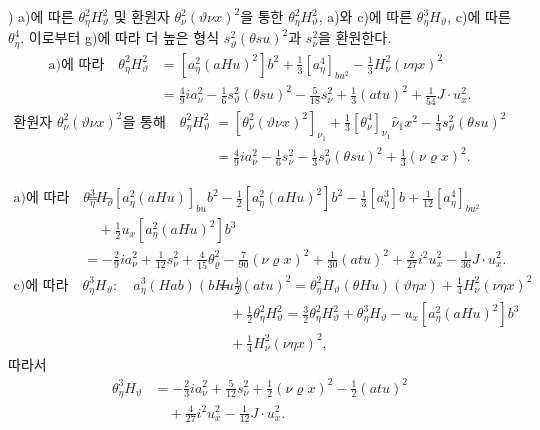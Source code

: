 ) a)에 따른 $\theta_\eta^2H_\vartheta^2$ 및 환원자 $\theta_\nu^2(\vartheta\nu x)^2$을 통한 $\theta_\eta^2H_\vartheta^2$, a)와 c)에 따른 $\theta_\eta^3H_\vartheta$, c)에 따른 $\theta_\eta^4$. 이로부터 g)에 따라 더 높은 형식 $s_\vartheta^2(\theta su)^2$과 $s_\nu^2$을 환원한다.
\[
\begin{aligned}
\text{a)에 따라}\quad
\theta_\eta^2H_\vartheta^2&=[a_\eta^2(aHu)^2]b^2+\frac13[a_\eta^4]_{bu^2}-\frac13H_\nu^2(\nu\eta x)^2\\
&=\frac49ia_\nu^2-\frac16s_\vartheta^2(\theta su)^2-\frac5{18}s_\nu^2+\frac13(atu)^2+\frac1{54}J\cdot u_x^2.
\end{aligned}
\]
\[
\begin{aligned}
\text{환원자 }\theta_\nu^2(\vartheta\nu x)^2\text{을 통해}\quad
\theta_\eta^2H_\vartheta^2
&=[\theta_\nu^2(\vartheta\nu x)^2]_{\nu_1}+\frac13[\theta_\nu^4]_{\nu_1}\widehat{\nu}_1x^2-\frac13s_\vartheta^2(\theta su)^2\\
&=\frac49ia_\nu^2-\frac16s_\nu^2-\frac13s_\vartheta^2(\theta su)^2+\frac13(\nu\varrho x)^2.
\end{aligned}
\]

\[
\begin{aligned}
\text{a)에 따라}\quad
\theta_\eta^3H_\vartheta&=-[a_\eta^2(aHu)]_{bu}b^2-\frac12[a_\eta^2(aHu)^2]b^2-\frac13[a_\eta^3]b+\frac1{12}[a_\eta^4]_{bu^2}\\
&\quad+\frac12u_x[a_\eta^2(aHu)^2]b^3\\
&=-\frac29ia_\nu^2+\frac1{12}s_\nu^2+\frac4{15}\theta_\varrho^2-\frac7{90}(\nu\varrho x)^2+\frac1{30}(atu)^2+\frac2{27}i^2u_x^2-\frac1{36}J\cdot u_x^2.
\end{aligned}
\]
\[
\begin{aligned}
\text{c)에 따라}\quad
\theta_\eta^3H_\vartheta:\quad a_\eta^3(Hab)(bHu)&=\frac12(atu)^2
=\theta_\eta^2H_\vartheta(\theta Hu)(\vartheta\eta x)+\frac14H_\nu^2(\nu\eta x)^2\\
&\quad+\frac12\theta_\eta^2H_\vartheta^2
=\frac32\theta_\eta^2H_\vartheta^2+\theta_\eta^3H_\vartheta-u_x[a_\eta^2(aHu)^2]b^3\\
&\quad+\frac14H_\nu^2(\nu\eta x)^2,
\end{aligned}
\]
따라서
\[
\begin{aligned}
\theta_\eta^3H_\vartheta&=-\frac23ia_\nu^2+\frac5{12}s_\nu^2+\frac12(\nu\varrho x)^2-\frac12(atu)^2\\
&\quad+\frac4{27}i^2u_x^2-\frac1{12}J\cdot u_x^2.
\end{aligned}
\]


